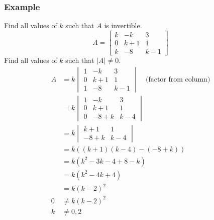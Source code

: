 \documentclass[letterpaper, 12pt]{math}
\begin{document}
\subsubsection*{Example}
Find all values of \( k \) such that \( A \) is invertible.
\[ A = \begin{bmatrix}k & -k & 3 \\ 0 & k+1 & 1 \\ k & -8 & k-1\end{bmatrix} \]
Find all values of \( k \) such that \( |A|\ne0 \).
\begin{align*}
  A &= k\begin{vmatrix}
    1 & -k & 3 \\
    0 & k+1 & 1 \\
    1 & -8 & k-1
  \end{vmatrix} \quad \text{(factor from column)}\\
  &= k\begin{vmatrix}
    1 & -k & 3 \\
    0 & k+1 & 1 \\
    0 & -8+k & k-4
  \end{vmatrix} \\
  &= k\begin{vmatrix}
    k+1 & 1 \\
    -8+k & k-4
  \end{vmatrix} \\
  &= k((k+1)(k-4)-(-8+k)) \\
  &= k(k^2-3k-4+8-k) \\
  &= k(k^2-4k+4) \\
  &= k(k-2)^2 \\
  0 &\ne k(k-2)^2 \\
  k &\ne 0,2
\end{align*}
\end{document}
